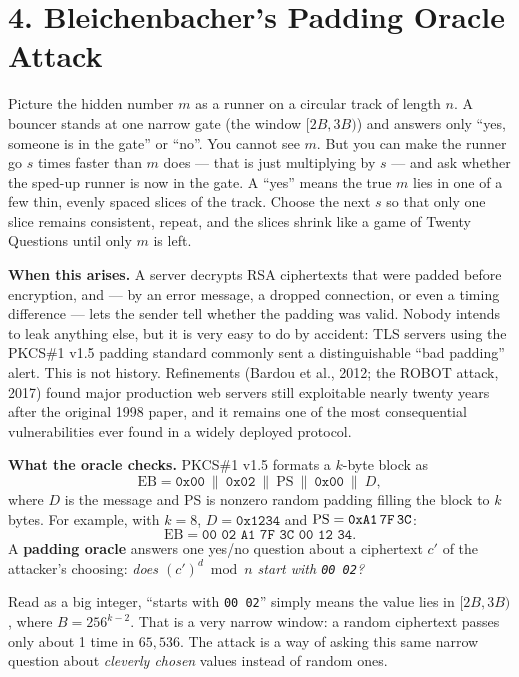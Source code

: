 \documentclass[11pt]{article}
\begin{document}
\hrulefill

\section*{4. Bleichenbacher's Padding Oracle Attack}

\begin{intuition}
Picture the hidden number $m$ as a runner on a circular track of length $n$. A bouncer stands at one narrow gate (the window $[2B,3B)$) and answers only ``yes, someone is in the gate'' or ``no''. You cannot see $m$. But you can make the runner go $s$ times faster than $m$ does --- that is just multiplying by $s$ --- and ask whether the sped-up runner is now in the gate. A ``yes'' means the true $m$ lies in one of a few thin, evenly spaced slices of the track. Choose the next $s$ so that only one slice remains consistent, repeat, and the slices shrink like a game of Twenty Questions until only $m$ is left.
\end{intuition}

\textbf{When this arises.} A server decrypts RSA ciphertexts that were padded before encryption, and --- by an error message, a dropped connection, or even a timing difference --- lets the sender tell whether the padding was valid. Nobody intends to leak anything else, but it is very easy to do by accident: TLS servers using the PKCS\#1 v1.5 padding standard commonly sent a distinguishable ``bad padding'' alert. This is not history. Refinements (Bardou et al., 2012; the ROBOT attack, 2017) found major production web servers still exploitable nearly twenty years after the original 1998 paper, and it remains one of the most consequential vulnerabilities ever found in a widely deployed protocol.

\textbf{What the oracle checks.} PKCS\#1 v1.5 formats a $k$-byte block as
\[
\text{EB} = \texttt{0x00}\ \|\ \texttt{0x02}\ \|\ \text{PS}\ \|\ \texttt{0x00}\ \|\ D,
\]
where $D$ is the message and PS is nonzero random padding filling the block to $k$ bytes. For example, with $k=8$, $D=\texttt{0x1234}$ and $\text{PS}=\texttt{0xA1\,7F\,3C}$:
\[
\text{EB}=\texttt{00\ 02\ A1\ 7F\ 3C\ 00\ 12\ 34}.
\]
A \textbf{padding oracle} answers one yes/no question about a ciphertext $c'$ of the attacker's choosing: \emph{does $(c')^d \bmod n$ start with \texttt{00 02}?}

Read as a big integer, ``starts with \texttt{00 02}'' simply means the value lies in $[2B,3B)$, where $B=256^{k-2}$. That is a very narrow window: a random ciphertext passes only about 1 time in $65{,}536$. The attack is a way of asking this same narrow question about \emph{cleverly chosen} values instead of random ones.
\end{document}
